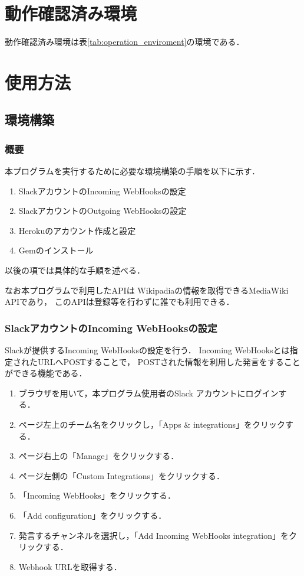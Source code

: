 \documentclass[fleqn, 14pt]{extarticlej}
\begin{document}
   
\section{動作確認済み環境}
\label{sec:condirmed_enviroment}
動作確認済み環境は表\ref{tab:operation_enviroment}の環境である．

\section{使用方法}
\label{usage}


\subsection{環境構築}
\label{sec:enviroment_construction}
\subsubsection{概要}
本プログラムを実行するために必要な環境構築の手順を以下に示す．
\begin{enumerate}
\item SlackアカウントのIncoming WebHooksの設定
\item SlackアカウントのOutgoing WebHooksの設定
\item Herokuのアカウント作成と設定
\item Gemのインストール
\end{enumerate}
以後の項では具体的な手順を述べる．

なお本プログラムで利用したAPIは
Wikipadiaの情報を取得できるMediaWiki API\cite{Media-Wiki}であり，
このAPIは登録等を行わずに誰でも利用できる．

\subsubsection{SlackアカウントのIncoming WebHooksの設定}
Slackが提供するIncoming WebHooksの設定を行う．
Incoming WebHooksとは指定されたURLへPOSTすることで，
POSTされた情報を利用した発言をすることができる機能である．
\label{subsub:incoming_webhook}
\begin{enumerate}
\item ブラウザを用いて，本プログラム使用者のSlack アカウントにログインする．
\item ページ左上のチーム名をクリックし，「Apps \& integrations」をクリックする．
\item ページ右上の「Manage」をクリックする．
\item \label{item:custom_integration}
  ページ左側の「Custom Integrations」をクリックする．
\item 「Incoming WebHooks」をクリックする．
\item 「Add configuration」をクリックする．
\item 発言するチャンネルを選択し，「Add Incoming WebHooks integration」をクリックする．
\item \label{item:get_webhookurl}Webhook URLを取得する． 
\end{enumerate}
\end{document}
